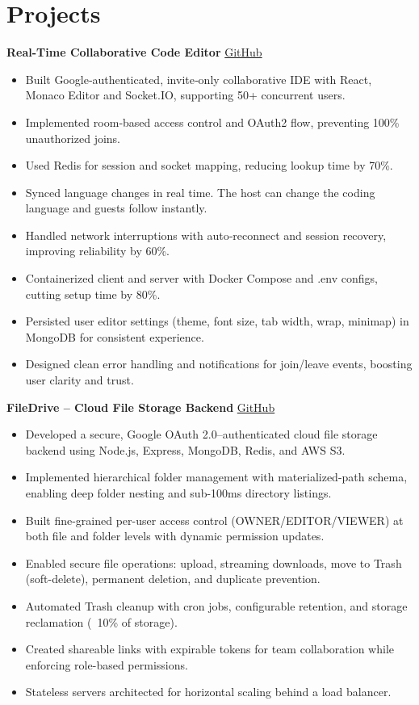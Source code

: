 \documentclass[a4paper,10pt]{article}
\newcommand{\resumeItem}[1]{\item\small{#1}}
\begin{document}
\section*{Projects}
\textbf{Real-Time Collaborative Code Editor} \hfill \href{https://github.com/mohankumarkadiri/collab-code-editor}{GitHub}
\vspace{6pt}
\begin{itemize}[leftmargin=*,itemsep=2pt]
  \resumeItem{Built Google‑authenticated, invite‑only collaborative IDE with React, Monaco Editor and Socket.IO, supporting 50+ concurrent users.}
  \resumeItem{Implemented room‑based access control and OAuth2 flow, preventing 100\% unauthorized joins.}
  \resumeItem{Used Redis for session and socket mapping, reducing lookup time by 70\%.}
  \resumeItem{Synced language changes in real time. The host can change the coding language and guests follow instantly.}
  \resumeItem{Handled network interruptions with auto‑reconnect and session recovery, improving reliability by 60\%.}
  \resumeItem{Containerized client and server with Docker Compose and .env configs, cutting setup time by 80\%.}
  \resumeItem{Persisted user editor settings (theme, font size, tab width, wrap, minimap) in MongoDB for consistent experience.}
  \resumeItem{Designed clean error handling and notifications for join/leave events, boosting user clarity and trust.}
\end{itemize}

\vspace{6pt}

\textbf{FileDrive – Cloud File Storage Backend} \hfill \href{https://github.com/mohankumarkadiri/File-Drive}{GitHub}
\vspace{6pt}
\begin{itemize}[leftmargin=*,itemsep=2pt]
  \resumeItem{Developed a secure, Google OAuth 2.0–authenticated cloud file storage backend using Node.js, Express, MongoDB, Redis, and AWS S3.}
  \resumeItem{Implemented hierarchical folder management with materialized-path schema, enabling deep folder nesting and sub-100ms directory listings.}
  \resumeItem{Built fine-grained per-user access control (OWNER/EDITOR/VIEWER) at both file and folder levels with dynamic permission updates.}
  \resumeItem{Enabled secure file operations: upload, streaming downloads, move to Trash (soft-delete), permanent deletion, and duplicate prevention.}
  \resumeItem{Automated Trash cleanup with cron jobs, configurable retention, and storage reclamation (~10\% of storage).}
  \resumeItem{Created shareable links with expirable tokens for team collaboration while enforcing role-based permissions.}
  \resumeItem{Stateless servers architected for horizontal scaling behind a load balancer.}
\end{itemize}
\end{document}
